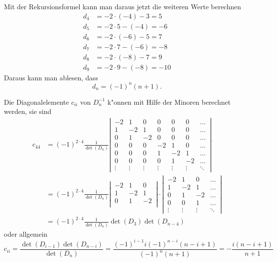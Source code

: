 \begin{loesung}
\begin{teilaufgaben}
Mit der Rekursionsformel kann man daraus jetzt die weiteren Werte berechnen
\begin{align*}
d_4&=-2\cdot(-4) - 3 = 5\\
d_5&=-2\cdot 5 -(-4) = -6\\
d_6&=-2\cdot(-6) - 5 = 7\\
d_7&=-2\cdot 7 -(-6) = -8\\
d_8&=-2\cdot(-8) - 7 = 9\\
d_9&=-2\cdot 9 -(-8) = -10
\end{align*}
Daraus kann man ablesen, dass
\[
d_n=(-1)^n(n+1).
\]
\item
Die Diagonalelemente $c_{ii}$ von $D_n^{-1}$ k"onnen mit Hilfe der Minoren berechnet werden,
sie sind
\begin{align*}
c_{44}
&=
(-1)^{2\cdot 4}\frac{1}{\det(D_n)}
\left|\,
\begin{matrix}
-2& 1& 0& 0& 0& 0&\dots\\
 1&-2& 1& 0& 0& 0&\dots\\
 0& 1&-2& 0& 0& 0&\dots\\
 0& 0& 0&-2& 1& 0&\dots\\
 0& 0& 0& 1&-2& 1&\dots\\
 0& 0& 0& 0& 1&-2&\dots\\
\vdots&\vdots&\vdots&\vdots&\vdots&\vdots&\ddots
\end{matrix}
\,\right|
\\
&=
(-1)^{2\cdot 4}\frac{1}{\det(D_n)}
\left|\,
\begin{matrix}
-2& 1& 0\\
 1&-2& 1\\
 0& 1&-2\\
\end{matrix}
\,\right|
\cdot
\left|\,
\begin{matrix}
-2& 1& 0&\dots\\
 1&-2& 1&\dots\\
 0& 1&-2&\dots\\
 0& 0& 1&\dots\\
\vdots&\vdots&\vdots&\ddots
\end{matrix}
\,\right|
\\
&=
(-1)^{2\cdot 4}\frac{1}{\det(D_n)}\det(D_3)\det(D_{n-4})
\end{align*}
oder allgemein
\[
c_{ii}
=\frac{\det(D_{i-1})\det(D_{n-i})}{\det(D_n)}
=\frac{(-1)^{i-1}i(-1)^{n-i}(n-i+1)}{(-1)^n(n+1)}
=-\frac{i(n-i+1)}{n+1}
\]
\end{teilaufgaben}
\end{loesung}

